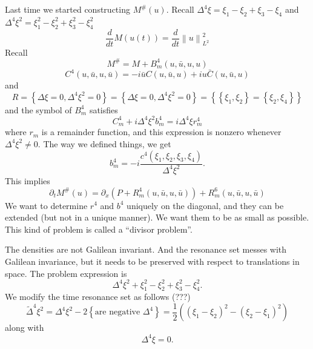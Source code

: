 \documentclass{article}
\newcommand\norm[1]{\left\lVert#1\right\rVert}
\begin{document}
Last time we started constructing $M^{\#}(u)$. Recall
$\Delta^{4}\xi=\xi_{1}-\xi_{2}+\xi_{3}-\xi_{4}$ and $\Delta^{4}\xi^{2}=\xi^{2}_{1}-\xi^{2}_{2}+\xi^{2}_{3}-\xi^{2}_{4}$ 
\begin{equation*}
  \frac{d}{dt}M(u(t)) 
  = \frac{d}{dt} \norm{u}_{L^{2}}^{2}
\end{equation*}
Recall
\begin{equation*}
  M^{\#}= M + B^{4}_{m}(u,\bar{u},u,u)
\end{equation*}
\begin{equation*}
  C^{4}(u,\bar{u},u,\bar{u}) 
  = -i \bar{u}C(u,\bar{u},u)+iu\bar{C}(u,\bar{u},u)
\end{equation*}
and
\begin{equation*}
  R
  = \left\{\Delta \xi = 0, \Delta ^{4}\xi^{2}=0\right\}
  = \left\{\Delta \xi = 0, \Delta ^{4}\xi^{2}=0\right\}
  = \left\{\left\{\xi_{1},\xi_{2}\right\}= \left\{\xi_{2},\xi_{4}\right\}\right\}
\end{equation*}
and the symbol of $B^{4}_{m}$  satisfies
\begin{equation*}
  C^{4}_{m}+i\Delta^{4}\xi^{2}b_{m}^{4}= i\Delta^{4}\xi r_{m}^{4}
\end{equation*}
where $r_{m}$ is a remainder function, and this expression is nonzero whenever
$\Delta^{4}\xi^{2}\neq 0$. The way we defined things, we get
\begin{equation*}
  b_{m}^{4} 
  = -i \frac{c^{4}(\xi_{1},\xi_{2},\xi_{3},\xi_{4})}{\Delta^{4}\xi^{2}}.
\end{equation*}
This implies
\begin{equation*}
  \partial_{t}M^{\#}(u) 
  = \partial_{x}\left(P+R^{4}_{m}(u,\bar{u},u,\bar{u})\right)
  + R^{6}_{m}(u,\bar{u},u,\bar{u})
\end{equation*}
We want to determine $r^{4}$ and $b^{4}$ uniquely on the
diagonal, and they can be extended (but not in a unique manner). We want them to
be as small as possible. This kind of problem is called a ``divisor problem''.

The densities are not Galilean invariant. And the resonance set messes with
Galilean invariance, but it needs to be preserved with respect to translations
in space. The problem expression is
\begin{equation*}
  \Delta^{4} \xi^{2} + \xi_{1}^{2}-\xi_{2}^{2}+\xi_{3}^{2}-\xi_{4}^{2}.
\end{equation*}
We modify the time resonance set as follows (???)
\begin{equation*}
  \tilde{\Delta}^{4}\xi^{2}
  = \Delta^{4}\xi^{2}-2 \left\{ \text{are negative } \Delta^{4}\right\}
  = \frac{1}{2} \left( \left( \xi_{1}-\xi_{2} \right)^{2}-\left( \xi_{2}-\xi_{1} \right)^{2}   \right) 
\end{equation*}
along with
\begin{equation*}
  \Delta^{4}\xi = 0.
\end{equation*}
\end{document}
